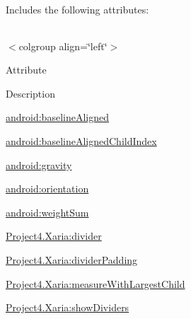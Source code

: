 Includes the following attributes\+:

\tabulinesep=1mm
\begin{longtabu} spread 0pt [c]{*{0}{|X[-1]}|}
\hline
\end{longtabu}
$<$colgroup align=\char`\"{}left\char`\"{}$>$ 

Attribute

Description 

{\ttfamily \hyperlink{classproject4_1_1xaria_1_1R_1_1styleable_a9be6e1f075c0511bc62f02db852f77d5}{android\+:baseline\+Aligned}}

{\ttfamily \hyperlink{classproject4_1_1xaria_1_1R_1_1styleable_ab84764f190efeef60cefb6eba9332ba5}{android\+:baseline\+Aligned\+Child\+Index}}

{\ttfamily \hyperlink{classproject4_1_1xaria_1_1R_1_1styleable_a2a3b513c0f7f71ed6b75218dd32d011e}{android\+:gravity}}

{\ttfamily \hyperlink{classproject4_1_1xaria_1_1R_1_1styleable_a2cd81e7b3c982ef6daea0093965c9ea9}{android\+:orientation}}

{\ttfamily \hyperlink{classproject4_1_1xaria_1_1R_1_1styleable_a3787a7bcd5b812a12873e33ec20a496c}{android\+:weight\+Sum}}

{\ttfamily \hyperlink{classproject4_1_1xaria_1_1R_1_1styleable_a203fc5f441152f8ffcecb5604e918fa0}{Project4.\+Xaria\+:divider}}

{\ttfamily \hyperlink{classproject4_1_1xaria_1_1R_1_1styleable_aabd76c769aacad577cc5b52c4a9cffb6}{Project4.\+Xaria\+:divider\+Padding}}

{\ttfamily \hyperlink{classproject4_1_1xaria_1_1R_1_1styleable_a83b43869079dce397a9b632d885316f2}{Project4.\+Xaria\+:measure\+With\+Largest\+Child}}

{\ttfamily \hyperlink{classproject4_1_1xaria_1_1R_1_1styleable_aa54ceb6abf29ba55186f4ef137e636d8}{Project4.\+Xaria\+:show\+Dividers}}

